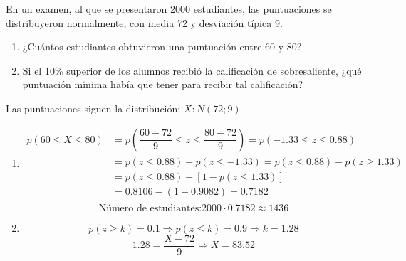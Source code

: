 \begin{exercise}
  En un examen, al que se presentaron 2000 estudiantes, las puntuaciones se distribuyeron normalmente, con media 72 y desviación típica 9.
  \begin{enumerate}[label=\alph* )]
  \item ¿Cuántos estudiantes obtuvieron una puntuación entre 60 y 80?
  \item Si el 10\% superior de los alumnos recibió la calificación de sobresaliente, ¿qué puntuación mínima había que tener para recibir tal calificación?
  \end{enumerate}

  \tcblower

  Las puntuaciones siguen la distribución: $X:N(72;9)$
  \begin{enumerate}[label=\alph* )]
  \item
  \begin{align*}
  p(60 \leq X \leq 80) & = p \left( \dfrac{60-72}{9} \leq z \leq \dfrac{80-72}{9} \right) =p(-1.33 \leq z \leq 0.88)  \\
  & =p(z \leq 0.88)-p(z \leq -1.33)= p(z\leq 0.88)-p(z \geq 1.33) \\
  & =p(z \leq 0.88)-[1-p(z \leq 1.33)] \\
  &  =0.8106-(1-0.9082)=0.7182 \\
  \end{align*}
  \[ \text{Número de estudiantes:} 2000 \cdot 0.7182 \approx 1436 \]

  \item
  \[ p(z \geq k)=0.1 \Rightarrow p(z \leq k)= 0.9 \Rightarrow k=1.28 \]
  \[ 1.28 = \dfrac{X-72}{9} \Rightarrow X=83.52 \]
  \end{enumerate}
\end{exercise}

